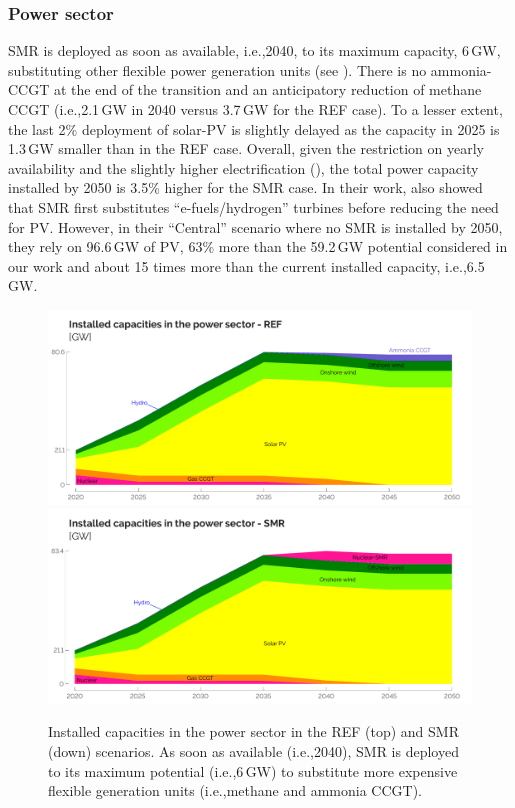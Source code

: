 \documentclass[11pt,twoside,a4paper,english]{article}
\def\ie{i.e.,}
\begin{document}
\subsubsection{Power sector}
\label{subsubsec:atom_mol:results_deter_power_sector}
\gls{SMR} is deployed as soon as available, \ie 2040, to its maximum capacity, 6\,GW, substituting other flexible power generation units (see ). There is no ammonia-\gls{CCGT} at the end of the transition and an anticipatory reduction of methane \gls{CCGT} (\ie 2.1\,GW in 2040 versus 3.7\,GW for the REF case). To a lesser extent, the last 2\% deployment of solar-\gls{PV} is slightly delayed as the capacity in 2025 is 1.3\,GW smaller than in the REF case. Overall, given the restriction on yearly availability and the slightly higher electrification (), the total power capacity installed by 2050 is 3.5\% higher for the SMR case. In their work, \citet{PATHS2050} also showed that \gls{SMR} first substitutes ``e-fuels/hydrogen'' turbines before reducing the need for \gls{PV}. However, in their ``Central'' scenario where no \gls{SMR} is installed by 2050, they rely on 96.6\,GW of \gls{PV}, 63\% more than the 59.2\,GW potential considered in our work and about 15 times more than the current installed capacity, \ie 6.5\,GW. 

\begin{figure}[t!]
\centering
\includegraphics[width=\textwidth]{Elec_Tech_Cap_REF.pdf}
\includegraphics[width=\textwidth]{Elec_Tech_Cap_SMR.pdf}
\caption{Installed capacities in the power sector in the REF (top) and SMR (down) scenarios. As soon as available (\ie 2040), \acrfull{SMR} is deployed to its maximum potential (\ie 6\,GW) to substitute more expensive flexible generation units (\ie methane and ammonia \gls{CCGT}).}
\label{fig:results_deter_tech_cap_elec}
\end{figure}
\end{document}
